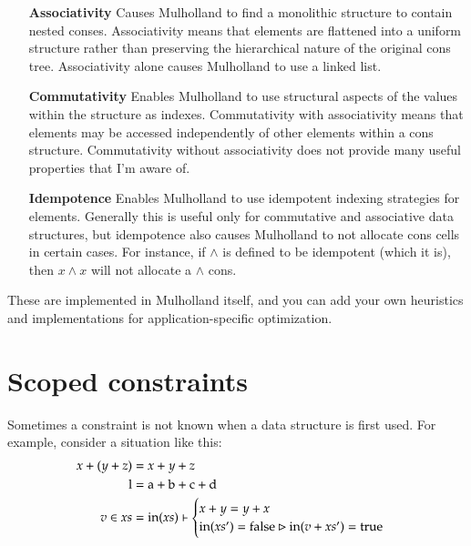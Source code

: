 \documentclass{report}
\begin{document}
\begin{enumerate}
\item[\bf Associativity]
  Causes Mulholland to find a monolithic structure to contain nested conses. Associativity means that elements are flattened into a uniform structure rather than preserving the
  hierarchical nature of the original cons tree. Associativity alone causes Mulholland to use a linked list.

\item[\bf Commutativity]
  Enables Mulholland to use structural aspects of the values within the structure as indexes. Commutativity with associativity means that elements may be accessed independently of other
  elements within a cons structure. Commutativity without associativity does not provide many useful properties that I'm aware of.

\item[\bf Idempotence]
  Enables Mulholland to use idempotent indexing strategies for elements. Generally this is useful only for commutative and associative data structures, but idempotence also causes
  Mulholland to not allocate cons cells in certain cases. For instance, if $\wedge$ is defined to be idempotent (which it is), then $x \wedge x$ will not allocate a $\wedge$ cons.
\end{enumerate}

    These are implemented in Mulholland itself, and you can add your own heuristics and implementations for application-specific optimization.

\section{Scoped constraints}
    Sometimes a constraint is not known when a data structure is first used. For example, consider a situation like this:
\begin{align*}
x + (y + z) & = x + y + z \\
\textrm l   & = \textrm a + \textrm b + \textrm c + \textrm d \\
v \in xs    & = \textrm{in}(xs) \vdash \begin{cases}
                                         x + y = y + x \\
                                         \textrm{in}(xs') = \textrm{false} \rhd \textrm{in}(v + xs') = \textrm{true}
                                       \end{cases}
\end{align*}
\end{document}
